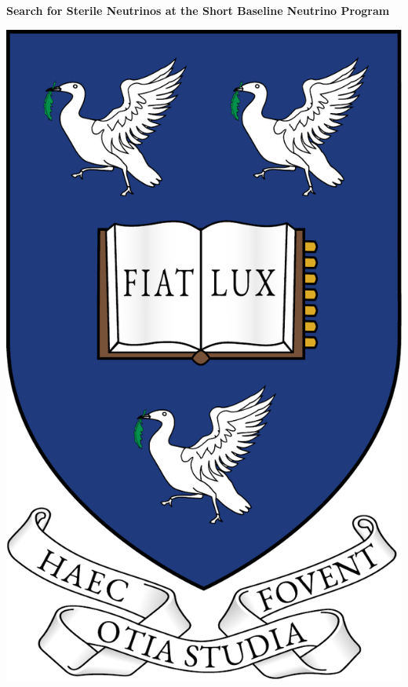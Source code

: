 \thispagestyle{empty}
\vfill
\begin{center}
	\begin{minipage}{1\linewidth}
		\centering
		\vspace{2cm}		
		{\Huge \textbf{Search for Sterile Neutrinos at the Short Baseline Neutrino Program}\par}
		\vspace{2.5cm}
		\includegraphics[width=0.5\smallfigwidth]{figures-coat_of_arms/Arms_of_the_University_of_Liverpool.pdf} \par
		\vspace{2cm}

\end{minipage}
\end{center}
